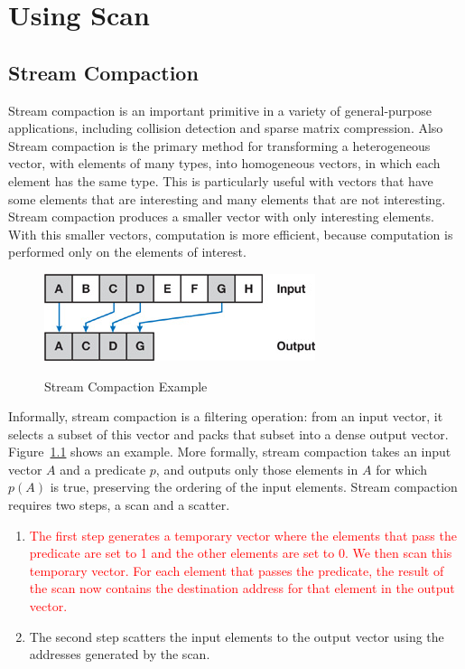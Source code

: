 \documentclass[Ingles]{ic-tese-v1}
\newcommand{\ed}[1]{\noindent\textcolor{red}{ {#1}}}
\newcommand{\ed}[1]{}
\begin{document}
\chapter{Using Scan}
\label{cap:ScanUse}

\section{Stream Compaction}

Stream compaction is an important primitive in a variety of general-purpose applications, including collision detection and sparse matrix compression. Also Stream compaction is the primary method for transforming a heterogeneous vector, with elements of many types, into homogeneous vectors, in which each element has the same type. This is particularly useful with vectors that have some elements that are interesting and many elements that are not interesting. Stream compaction produces a smaller vector with only interesting elements. With this smaller vectors, computation is more efficient, because computation is performed only on the  elements of interest.\\
\begin{figure}[t]
	\centering
	\caption{Stream Compaction Example}
	\includegraphics[scale=1.2]{images/stremexample.jpg}
	\label{fig:streamexample}
\end{figure}
Informally, stream compaction is a filtering operation: from an input vector, it selects a subset of this vector and packs that subset into a dense output vector. Figure~\ref{fig:streamexample} shows an example. More formally, stream compaction takes an input vector $A$ and a predicate $p$, and outputs only those elements in $A$ for which $p(A)$ is true, preserving the ordering of the input elements. 
Stream compaction requires two steps, a scan and a scatter.
\begin{enumerate}  
\item \ed{The first step generates a temporary vector where the elements that pass the predicate are set to 1 and the other elements are set to 0. We then scan this temporary vector. For each element that passes the predicate, the result of the scan now contains the destination address for that element in the output vector.}
\item The second step scatters the input elements to the output vector using the addresses generated by the scan.
\end{enumerate}
\end{document}
